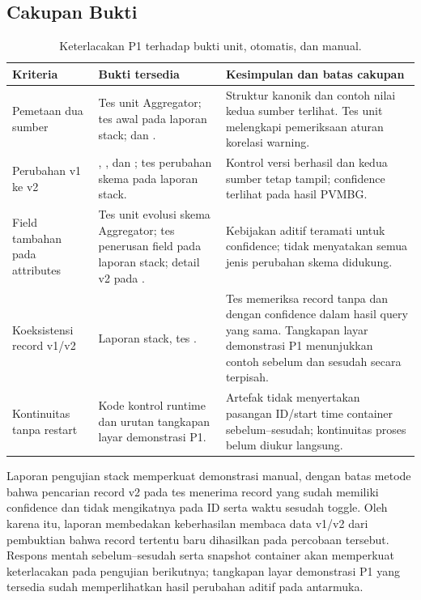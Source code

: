\subsection{Cakupan Bukti}
\begin{table}[H]\small
\begin{tabularx}{\textwidth}{@{}P{3.3cm}YY@{}}
\toprule \textbf{Kriteria} & \textbf{Bukti tersedia} & \textbf{Kesimpulan dan batas cakupan}\\\midrule
Pemetaan dua sumber & Tes unit Aggregator; tes awal pada laporan stack;  dan . & Struktur kanonik dan contoh nilai kedua sumber terlihat. Tes unit melengkapi pemeriksaan aturan korelasi warning.\\
Perubahan v1 ke v2 & , , dan ; tes perubahan skema pada laporan stack. & Kontrol versi berhasil dan kedua sumber tetap tampil; confidence terlihat pada hasil PVMBG.\\
Field tambahan pada attributes & Tes unit evolusi skema Aggregator; tes penerusan field pada laporan stack; detail v2 pada . & Kebijakan aditif teramati untuk confidence; tidak menyatakan semua jenis perubahan skema didukung.\\
Koeksistensi record v1/v2 & Laporan stack, tes . & Tes memeriksa record tanpa dan dengan confidence dalam hasil query yang sama. Tangkapan layar demonstrasi P1 menunjukkan contoh sebelum dan sesudah secara terpisah.\\
Kontinuitas tanpa restart & Kode kontrol runtime dan urutan tangkapan layar demonstrasi P1. & Artefak tidak menyertakan pasangan ID/start time container sebelum--sesudah; kontinuitas proses belum diukur langsung.\\\bottomrule
\end{tabularx}
\caption{Keterlacakan P1 terhadap bukti unit, otomatis, dan manual.}
\end{table}

Laporan pengujian stack memperkuat demonstrasi manual, dengan batas metode bahwa pencarian record v2 pada tes menerima record yang sudah memiliki confidence dan tidak mengikatnya pada ID serta waktu sesudah toggle. Oleh karena itu, laporan membedakan keberhasilan membaca data v1/v2 dari pembuktian bahwa record tertentu baru dihasilkan pada percobaan tersebut. Respons mentah sebelum--sesudah serta snapshot container akan memperkuat keterlacakan pada pengujian berikutnya; tangkapan layar demonstrasi P1 yang tersedia sudah memperlihatkan hasil perubahan aditif pada antarmuka.
